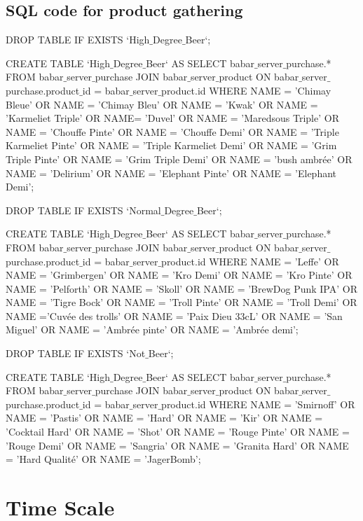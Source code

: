 \documentclass{report}
\begin{document}
\subsection{SQL code for product gathering}

DROP TABLE IF EXISTS `High$\_$Degree$\_$Beer`;

CREATE TABLE `High$\_$Degree$\_$Beer` 
	AS SELECT babar$\_$server$\_$purchase.* FROM babar$\_$server$\_$purchase JOIN babar$\_$server$\_$product ON babar$\_$server$\_$purchase.product$\_$id = babar$\_$server$\_$product.id WHERE
	NAME = 'Chimay Bleue' OR NAME = 'Chimay Bleu' OR NAME = 'Kwak' OR NAME = 'Karmeliet Triple' OR NAME= 'Duvel' OR NAME = 'Maredsous Triple'
	OR NAME = 'Chouffe Pinte' OR NAME = 'Chouffe Demi'  OR NAME = 'Triple Karmeliet Pinte' OR NAME = 'Triple Karmeliet Demi'  OR NAME = 'Grim Triple Pinte'
	OR NAME = 'Grim Triple Demi' OR NAME = 'bush ambrée' OR NAME = 'Delirium' OR NAME = 'Elephant Pinte' OR NAME = 'Elephant Demi';



DROP TABLE IF EXISTS `Normal$\_$Degree$\_$Beer`;

CREATE TABLE `High$\_$Degree$\_$Beer` 
	AS SELECT babar$\_$server$\_$purchase.* FROM babar$\_$server$\_$purchase JOIN babar$\_$server$\_$product ON babar$\_$server$\_$purchase.product$\_$id = babar$\_$server$\_$product.id WHERE
	NAME = 'Leffe' OR NAME = 'Grimbergen' OR NAME = 'Kro Demi' OR NAME = 'Kro Pinte' OR NAME = 'Pelforth' OR NAME = 'Skoll' OR NAME = 'BrewDog Punk IPA' 
	OR NAME = 'Tigre Bock' OR NAME = 'Troll Pinte' OR NAME = 'Troll Demi' OR NAME ='Cuvée des trolls' OR NAME = 'Paix Dieu 33cL' OR NAME = 'San Miguel'
	OR NAME = 'Ambrée pinte' OR NAME = 'Ambrée demi';
	
	
	
DROP TABLE IF EXISTS `Not$\_$Beer`;

CREATE TABLE `High$\_$Degree$\_$Beer` 
	AS SELECT babar$\_$server$\_$purchase.* FROM babar$\_$server$\_$purchase JOIN babar$\_$server$\_$product ON babar$\_$server$\_$purchase.product$\_$id = babar$\_$server$\_$product.id WHERE
	NAME = 'Smirnoff' OR NAME = 'Pastis' OR NAME = 'Hard' OR NAME = 'Kir' OR NAME = 'Cocktail Hard' OR NAME = 'Shot' OR NAME = 'Rouge Pinte' OR NAME = 'Rouge Demi' 
	OR NAME = 'Sangria' OR NAME = 'Granita Hard' OR NAME = 'Hard Qualité' OR NAME  = 'JagerBomb';
	

\section{Time Scale}
\end{document}
